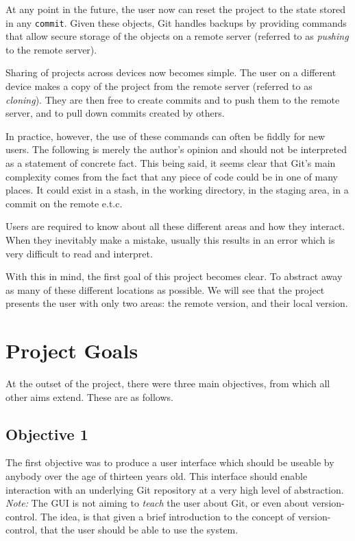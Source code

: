 At any point in the future, the user now can reset the project to the state stored in any \texttt{commit}. Given these objects, Git handles backups by providing commands that allow secure storage of the objects on a remote server (referred to as \emph{pushing} to the remote server). 

Sharing of projects across devices now becomes simple. The user on a different device makes a copy of the project from the remote server (referred to as \emph{cloning}). They are then free to create commits and to push them to the remote server, and to pull down commits created by others.

In practice, however, the use of these commands can often be fiddly for new users.  The following is merely the author's opinion and should not be interpreted as a statement of concrete fact. This being said, it seems clear that Git's main complexity comes from the fact that any piece of code could be in one of many places. It could exist in a stash, in the working directory, in the staging area, in a commit on the remote e.t.c.

Users are required to know about all these different areas and how they interact. When they inevitably make a mistake, usually this results in an error which is very difficult to read and interpret. 

With this in mind, the first goal of this project becomes clear. To abstract away as many of these different locations as possible. We will see that the project presents the user with only two areas: the remote version, and their local version.

\section{Project Goals}\label{sec:projectgoals}

At the outset of the project, there were three main objectives, from which all other aims extend. These are as follows.\\

\subsection{Objective 1} 

The first objective was to produce a user interface which should be useable by anybody over the age of thirteen years old. This interface should enable interaction with an underlying Git repository at a very high level of abstraction. \emph{Note:} The GUI is not aiming to \emph{teach} the user about Git, or even about version-control. The idea, is that given a brief introduction to the concept of version-control, that the user should be able to use the system.

